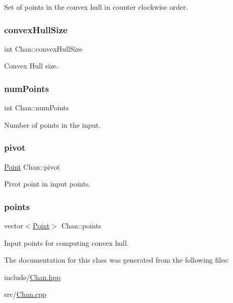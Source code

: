 Set of points in the convex hull in counter clockwise order. 

\mbox{\label{classChan_ae77990baa3fc9811d17fed02e4b73d70}} 
\subsubsection{\texorpdfstring{convex\+Hull\+Size}{convexHullSize}}
{\footnotesize\ttfamily int Chan\+::convex\+Hull\+Size\hspace{0.3cm}{\ttfamily [private]}}



Convex Hull size. 

\mbox{\label{classChan_a9f906daeea67573ca4fc09da32d2395f}} 
\subsubsection{\texorpdfstring{num\+Points}{numPoints}}
{\footnotesize\ttfamily int Chan\+::num\+Points\hspace{0.3cm}{\ttfamily [private]}}



Number of points in the input. 

\mbox{\label{classChan_a50d101e7ce6ac726592d8dc2f341cade}} 
\subsubsection{\texorpdfstring{pivot}{pivot}}
{\footnotesize\ttfamily \mbox{\hyperlink{classPoint}{Point}} Chan\+::pivot\hspace{0.3cm}{\ttfamily [private]}}



Pivot point in input points. 

\mbox{\label{classChan_a3c867cd91392509f20644fc59d73778c}} 
\subsubsection{\texorpdfstring{points}{points}}
{\footnotesize\ttfamily vector$<$\mbox{\hyperlink{classPoint}{Point}}$>$ Chan\+::points\hspace{0.3cm}{\ttfamily [private]}}



Input points for computing convex hull. 



The documentation for this class was generated from the following files\+:\begin{DoxyCompactItemize}
\item 
include/\mbox{\hyperlink{Chan_8hpp}{Chan.\+hpp}}\item 
src/\mbox{\hyperlink{Chan_8cpp}{Chan.\+cpp}}\end{DoxyCompactItemize}
